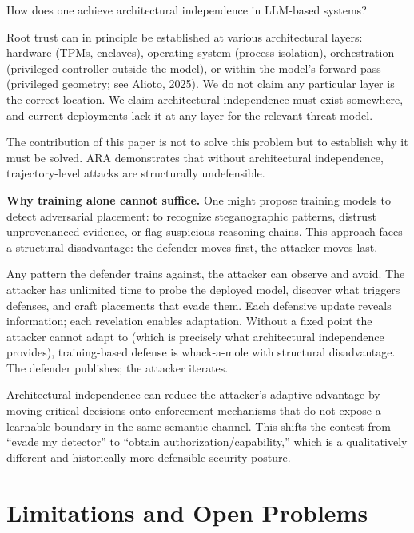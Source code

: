 \documentclass[11pt]{article}
\theoremstyle{definition}
\theoremstyle{plain}
\theoremstyle{remark}
\begin{document}
How does one achieve architectural independence in LLM-based systems?

Root trust can in principle be established at various architectural layers: hardware (TPMs, enclaves), operating system (process isolation), orchestration (privileged controller outside the model), or within the model's forward pass (privileged geometry; see Alioto, 2025). We do not claim any particular layer is the correct location. We claim architectural independence must exist somewhere, and current deployments lack it at any layer for the relevant threat model.

The contribution of this paper is not to solve this problem but to establish why it must be solved. ARA demonstrates that without architectural independence, trajectory-level attacks are structurally undefensible.

\textbf{Why training alone cannot suffice.} One might propose training models to detect adversarial placement: to recognize steganographic patterns, distrust unprovenanced evidence, or flag suspicious reasoning chains. This approach faces a structural disadvantage: the defender moves first, the attacker moves last.

Any pattern the defender trains against, the attacker can observe and avoid. The attacker has unlimited time to probe the deployed model, discover what triggers defenses, and craft placements that evade them. Each defensive update reveals information; each revelation enables adaptation. Without a fixed point the attacker cannot adapt to (which is precisely what architectural independence provides), training-based defense is whack-a-mole with structural disadvantage. The defender publishes; the attacker iterates.

Architectural independence can reduce the attacker's adaptive advantage by moving critical decisions onto enforcement mechanisms that do not expose a learnable boundary in the same semantic channel. This shifts the contest from ``evade my detector'' to ``obtain authorization/capability,'' which is a qualitatively different and historically more defensible security posture.

\section{Limitations and Open Problems}
\label{sec:limitations}
\end{document}
